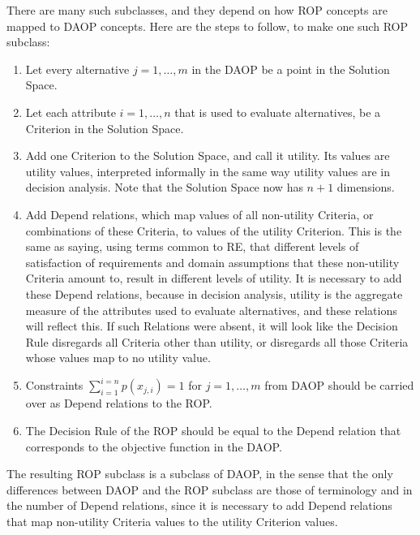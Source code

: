 \documentclass[graybox]{svmult}
\newcommand{\RE}{RE}
\newcommand{\SolutionSpace}{Solution Space}
\newcommand{\Criterion}{Criterion}
\newcommand{\Criteria}{Criteria}
\newcommand{\Depend}{Depend}
\newcommand{\DecisionRule}{Decision Rule}
\newcommand{\ROP}{ROP}
\begin{document}
There are many such subclasses, and they depend on how \ROP{} concepts are mapped to DAOP concepts. Here are the steps to follow, to make one such \ROP{} subclass:
\begin{enumerate}
    \item{Let every alternative $j = 1, \ldots, m$ in the DAOP be a point in the \SolutionSpace.} 
    \item{Let each attribute $i = 1, \ldots, n$ that is used to evaluate alternatives, be a \Criterion{} in the \SolutionSpace.}
    \item{Add one \Criterion{} to the \SolutionSpace, and call it utility. Its values are utility values, interpreted informally in the same way utility values are in decision analysis. Note that the \SolutionSpace{} now has $n+1$ dimensions.}
    \item{Add \Depend{} relations, which map values of all non-utility \Criteria, or combinations of these \Criteria, to values of the utility \Criterion. This is the same as saying, using terms common to \RE, that different levels of satisfaction of requirements and domain assumptions that these non-utility \Criteria{} amount to, result in different levels of utility. It is necessary to add these \Depend{} relations, because in decision analysis, utility is the aggregate measure of the attributes used to evaluate alternatives, and these relations will reflect this. If such Relations were absent, it will look like the \DecisionRule{} disregards all \Criteria{} other than utility, or disregards all those Criteria whose values map to no utility value.}
    \item{Constraints $\sum_{i=1}^{i=n}p(x_{j,i}) = 1$ for $j = 1, \ldots, m$ from DAOP should be carried over as \Depend{} relations to the \ROP.}
    \item{The \DecisionRule{} of the \ROP{} should be equal to the \Depend{} relation that corresponds to the objective function in the DAOP.}
\end{enumerate}

The resulting \ROP{} subclass is a subclass of DAOP, in the sense that the only differences between DAOP and the \ROP{} subclass are those of terminology and in the number of \Depend{} relations, since it is necessary to add \Depend{} relations that map non-utility \Criteria{} values to the utility \Criterion{} values. 



%
\end{document}
